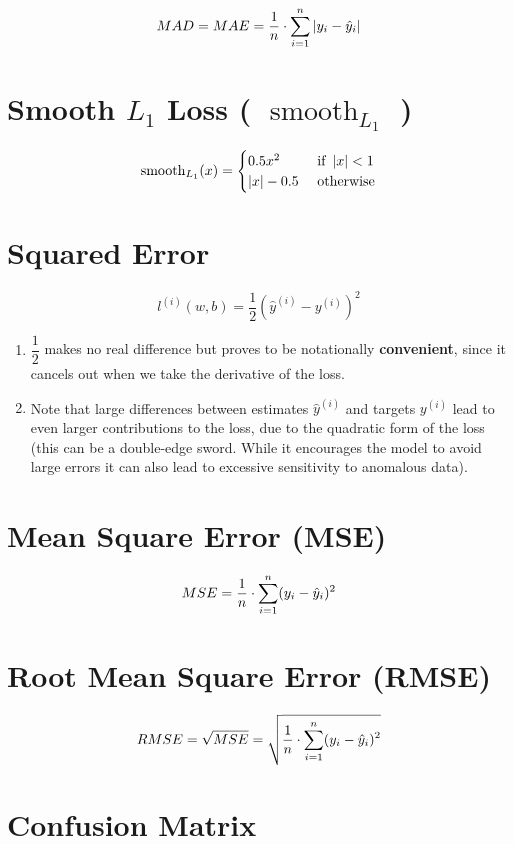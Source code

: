 \[
    MAD = MAE = \displaystyle\dfrac{1}{n} \cdot \displaystyle\sum_{i=1}^{n} \left|  y_i - \hat{y}_i  \right|
\]

\section{Smooth $L_1$ Loss ( $\operatorname{smooth}_{L_1}$ )}
\[
    \displaystyle
    \operatorname{smooth}_{L_1}(x) = \begin{cases}
        0.5x^2 & \text{ if } \left| x \right| < 1 \\
        \left| x \right| - 0.5 & \text{ otherwise}
    \end{cases}
\]


\section{Squared Error \cite{dnn-1}} \label{Squared Error}

\[
    l^{(i)}(w,b) = \dfrac{1}{2}
    \left( \hat{y}^{(i)} - y^{(i)} \right)^2
\]

\begin{enumerate}
    \item $\dfrac{1}{2}$ makes no real difference but proves to be notationally \textbf{convenient}, since it cancels out when we take the derivative of the loss.

    \item Note that large differences between estimates $\hat{y}^{(i)}$ and targets $y^{(i)}$ lead to even larger contributions to the loss, due to the quadratic form of the loss (this can be a double-edge sword. While it encourages the model to avoid large errors it can also lead to excessive sensitivity to anomalous data).
\end{enumerate}

\section{Mean Square Error (MSE)}\label{Mean Square Error (MSE)}
\[
    MSE = \displaystyle\dfrac{1}{n} \cdot \displaystyle\sum_{i=1}^{n} ( y_i - \hat{y}_i )^2
\]

\section{Root Mean Square Error (RMSE)}\label{Root Mean Square Error (RMSE)}
\[
    RMSE = \sqrt{MSE} = \displaystyle\sqrt{\dfrac{1}{n} \cdot \displaystyle\sum_{i=1}^{n} ( y_i - \hat{y}_i )^2}
\]


\section{Confusion Matrix}
